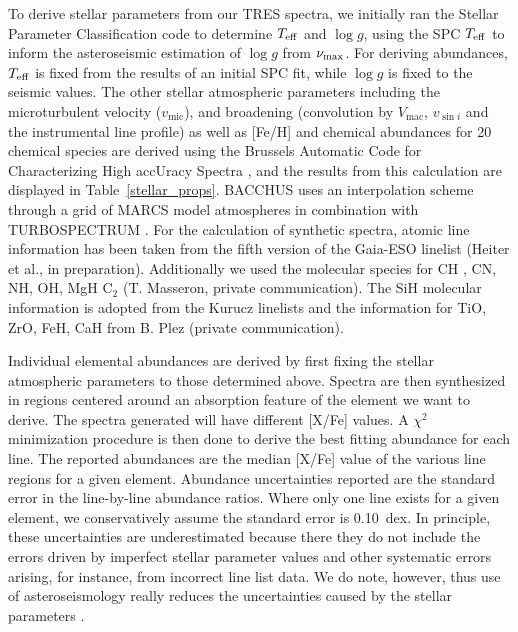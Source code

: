 \documentclass[a4paper,fleqn,usenatbib]{mnras}
\newcommand{\numax}{\mbox{$\nu_{\rm max}$}\xspace}
\newcommand{\teff}{\mbox{$T_{\rm eff}$}\xspace}
\newcommand{\logg}{\mbox{$\log g$}\xspace}
\begin{document}
To derive stellar parameters from our TRES spectra, we initially ran the Stellar Parameter Classification \citep[SPC:][]{spc} code to determine \teff and \logg, using the SPC \teff to inform the asteroseismic estimation of \logg from \numax. For deriving abundances, \teff is fixed from the results of an initial SPC fit, while \logg is fixed to the seismic values. The other stellar atmospheric parameters including the microturbulent velocity ($v_{\text{mic}}$), and broadening (convolution by $V_{\text{mac}}$, $v_{\sin{i}}$ and the instrumental line profile) as well as [Fe/H] and chemical abundances for 20 chemical species are derived using the Brussels Automatic Code for Characterizing High accUracy Spectra \citep[BACCHUS:][]{bacchus}, and the results from this calculation are displayed in Table~\ref{stellar_props}. BACCHUS uses an interpolation scheme through a grid of MARCS model atmospheres \citep{Gustafsson2008} in combination with TURBOSPECTRUM \citep{Alvarez1998, Plez2012}. For the calculation of synthetic spectra, atomic line information has been taken from the fifth version of the Gaia-ESO linelist (Heiter et al., in preparation). Additionally we used the molecular species for CH \citep{Masseron2014}, CN, NH, OH, MgH  C$_{2}$ (T. Masseron, private communication). The SiH molecular information is adopted from the Kurucz linelists and the information for TiO, ZrO, FeH, CaH from B. Plez (private communication). 

Individual elemental abundances are derived by first fixing the stellar atmospheric parameters to those determined above. Spectra are then synthesized  in regions centered around an absorption  feature of the element we want to derive. The spectra generated will have different [X/Fe] values. A $\chi^2$ minimization procedure is then done to derive the best fitting abundance for each line. The reported abundances are the median [X/Fe] value of the various line regions for a given element. Abundance uncertainties reported are the standard error in the line-by-line abundance ratios. Where only one line exists for a given element, we conservatively assume the standard error is 0.10~dex. In principle, these uncertainties are underestimated because there they do not include the errors driven by imperfect stellar parameter values and other systematic errors arising, for instance, from incorrect line list data. We do note, however, thus use of asteroseismology really reduces the uncertainties caused by the stellar parameters \citep[see][for a longer discussion on this]{hawkinsapogee}. 
\end{document}
